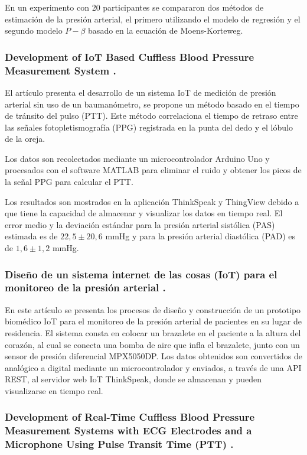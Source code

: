     En un experimento con 20 participantes se compararon dos métodos de estimación de la presión arterial, el primero utilizando el modelo de regresión y el segundo modelo $P-\beta$ basado en la ecuación de Moens-Korteweg.

    \subsubsection*{Development of IoT Based Cuffless Blood Pressure Measurement System \cite{Norsuriati_2021}.}

    El artículo presenta el desarrollo de un sistema IoT de medición de presión arterial sin uso de un baumanómetro, se propone un método basado en el tiempo de tránsito del pulso (PTT). Este método correlaciona el tiempo de retraso entre las señales fotopletismografía (PPG) registrada en la punta del dedo y el lóbulo de la oreja.

    Los datos son recolectados mediante un microcontrolador Arduino Uno y procesados con el software MATLAB para eliminar el ruido y obtener los picos de la señal PPG para calcular el PTT.
    
    Los resultados son mostrados en la aplicación ThinkSpeak y ThingView debido a que tiene la capacidad de almacenar y visualizar los datos en tiempo real. El error medio y la deviación estándar para la presión arterial sistólica (PAS) estimada es de $22,5 \pm 20,6$ mmHg y para la presión arterial diastólica (PAD) es de $1,6 \pm 1,2$ mmHg.

    \subsubsection*{Diseño de un sistema internet de las cosas (IoT) para el monitoreo de la presión arterial \cite{Estrada_2021}. }

    En este artículo se presenta los procesos de diseño y construcción de un prototipo biomédico IoT para el monitoreo de la presión arterial de pacientes en su lugar de residencia. El sistema consta en colocar un brazalete en el paciente a la altura del corazón, al cual se conecta una bomba de aire que infla el brazalete, junto con un sensor de presión diferencial MPX5050DP. Los datos obtenidos son convertidos de analógico a digital mediante un microcontrolador y enviados, a través de una API REST, al servidor web IoT ThinkSpeak, donde se almacenan y pueden visualizarse en tiempo real.

    \subsubsection*{Development of Real-Time Cuffless Blood Pressure Measurement Systems with ECG Electrodes and a Microphone Using Pulse Transit Time (PTT) \cite{Electrodes_Microphone}.}

